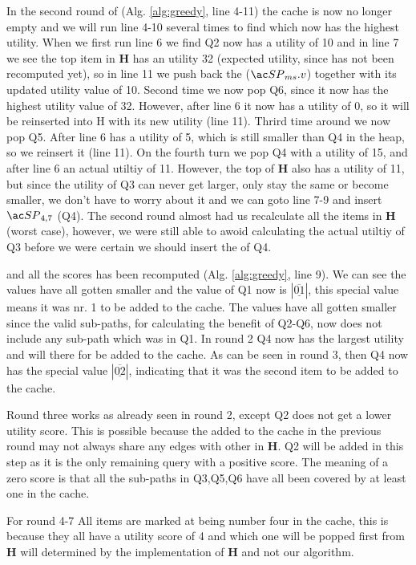 In the second round of \salgo (Alg. \ref{alg:greedy}, line 4-11) the cache is now no longer empty and we will run line 4-10 several times to find which \spath now has the highest utility. When we first run line 6 we find Q2 now has a utility of 10 and in line 7 we see the top item in \textbf{H} has an utility 32 (expected utility, since has not been recomputed yet), so in line 11 we push back the \spath ($\spath_{ms}.v$) together with its updated utility value of 10. Second time we now pop Q6, since it now has the highest utility value of 32. However, after line 6 it now has a utility of 0, so it will be reinserted into H with its new utility (line 11). Thrird time around we now pop Q5. After line 6 has a utility of 5, which is still smaller than Q4 in the heap, so we reinsert it (line 11). On the fourth turn we pop Q4 with a utility of 15, and after line 6 an actual utiltiy of 11. However, the top of \textbf{H} also has a utility of 11, but since the utility of Q3 can never get larger, only stay the same or become smaller, we don't have to worry about it and we can goto line 7-9 and insert $\spath_{4,7}$ (Q4). The second round almost had us recalculate all the items in \textbf{H} (worst case), however, we were still able to awoid calculating the actual utiltiy of Q3 before we were certain we should insert the \spath of Q4.


and all the scores has been recomputed (Alg. \ref{alg:greedy}, line 9). We can see the values have all gotten smaller and the value of Q1 now is $| \underline{\overline{01}}|$, this special value means it was nr. 1 to be added to the cache. The values have all gotten smaller since the valid sub-paths, for calculating the benefit of Q2-Q6, now does not include any sub-path which was in Q1. In round 2 Q4 now has the largest utility and will there for be added to the cache. As can be seen in round 3, then Q4 now has the special value $|\underline{\overline{02}}|$, indicating that it was the second item to be added to the cache.


Round three works as already seen in round 2, except Q2 does not get a lower utility score. This is possible because the \spath added to the cache in the previous round may not always share any edges with other \spaths in \textbf{H}. Q2 will be added in this step as it is the only remaining query with a positive score. The meaning of a zero score is that all the sub-paths in Q3,Q5,Q6 have all been covered by at least one \spath in the cache.

For round 4-7 All items are marked at being number four in the cache, this is because they all have a utility score of 4 and which one will be popped first from \textbf{H} will determined by the implementation of \textbf{H} and not our algorithm.


